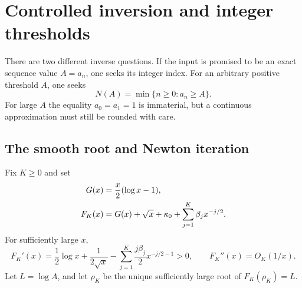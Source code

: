 \section{Controlled inversion and integer thresholds}\label{tks:sec:inverse}
There are two different inverse questions. If the input is promised to be an exact sequence value $A=a_n$, one seeks its integer index. For an arbitrary positive threshold $A$, one seeks
\begin{equation}\label{tks:eq:threshold}
N(A)=\min\{n\geq0:a_n\geq A\}.
\end{equation}
For large $A$ the equality $a_0=a_1=1$ is immaterial, but a continuous approximation must still be rounded with care.

\subsection{The smooth root and Newton iteration}
Fix $K\geq0$ and set
\begin{align}
G(x)&=\frac x2(\log x-1),\notag\\
F_K(x)&=G(x)+\sqrt x+\kappa_0
                         +\sum_{j=1}^{K}\beta_jx^{-j/2}.
                         \label{tks:eq:FK}
\end{align}
For sufficiently large $x$,
\begin{equation}\label{tks:eq:FKderivative}
F_K'(x)=\frac12\log x+\frac1{2\sqrt x}
 -\sum_{j=1}^{K}\frac{j\beta_j}{2}x^{-j/2-1}>0,
\qquad F_K''(x)=O_K(1/x).
\end{equation}
Let $L=\log A$, and let $\rho_K$ be the unique sufficiently large root of $F_K(\rho_K)=L$.

